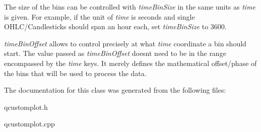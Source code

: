 The size of the bins can be controlled with {\itshape time\+Bin\+Size} in the same units as {\itshape time} is given. For example, if the unit of {\itshape time} is seconds and single O\+H\+L\+C/\+Candlesticks should span an hour each, set {\itshape time\+Bin\+Size} to 3600.

{\itshape time\+Bin\+Offset} allows to control precisely at what {\itshape time} coordinate a bin should start. The value passed as {\itshape time\+Bin\+Offset} doesn\textquotesingle{}t need to be in the range encompassed by the {\itshape time} keys. It merely defines the mathematical offset/phase of the bins that will be used to process the data. 

The documentation for this class was generated from the following files\+:\begin{DoxyCompactItemize}
\item 
qcustomplot.\+h\item 
qcustomplot.\+cpp\end{DoxyCompactItemize}
